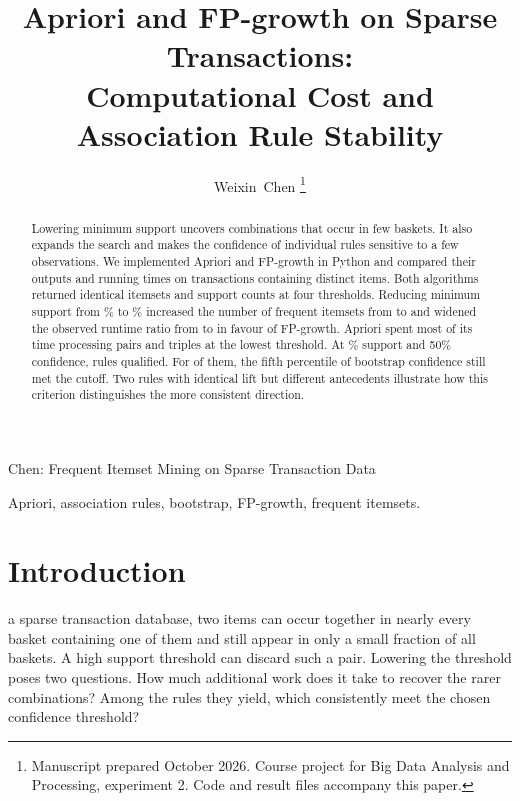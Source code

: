 \documentclass[journal]{IEEEtran}
\begin{document}
\title{Apriori and FP-growth on Sparse Transactions:\\
Computational Cost and Association Rule Stability}

\author{Weixin~Chen%
\thanks{Manuscript prepared October 2026.
Course project for Big Data Analysis and Processing, experiment 2.
Code and result files accompany this paper.}}

%
{Chen: Frequent Itemset Mining on Sparse Transaction Data}

\maketitle


\begin{abstract}
Lowering minimum support uncovers combinations that occur in few baskets. It also expands the search and makes the confidence of individual rules sensitive to a few observations.
We implemented Apriori and FP-growth in Python and compared their outputs and running times on \DSN{} transactions containing \DSItems{} distinct items.
Both algorithms returned identical itemsets and support counts at four thresholds.
Reducing minimum support from \SupPctA\% to \SupPctD\% increased the number of frequent itemsets from \ItemsA{} to \ItemsD{} and widened the observed runtime ratio from \SpeedupA{} to \SpeedupD{} in favour of FP-growth.
Apriori spent most of its time processing pairs and triples at the lowest threshold.
At \SupPctB\% support and 50\% confidence, \RobN{} rules qualified. For \RobPass{} of them, the fifth percentile of bootstrap confidence still met the cutoff. Two rules with identical lift but different antecedents illustrate how this criterion distinguishes the more consistent direction.
\end{abstract}

\begin{IEEEkeywords}
Apriori, association rules, bootstrap, FP-growth, frequent itemsets.
\end{IEEEkeywords}

\section{Introduction}
 a sparse transaction database, two items can occur together in nearly every basket containing one of them and still appear in only a small fraction of all baskets. A high support threshold can discard such a pair. Lowering the threshold poses two questions. How much additional work does it take to recover the rarer combinations? Among the rules they yield, which consistently meet the chosen confidence threshold?
\end{document}
